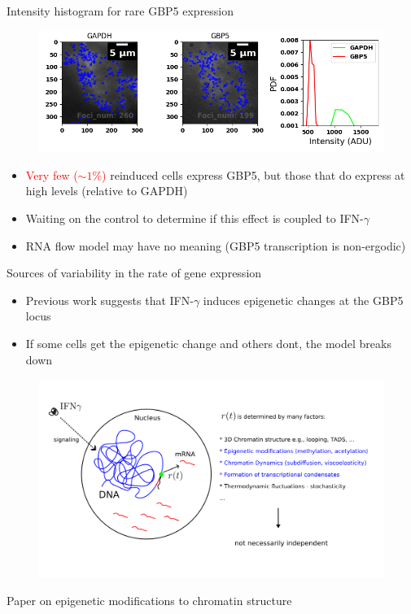 \documentclass[aspectratio=1610]{beamer}					%
\begin{document}
\begin{frame}{Intensity histogram for rare GBP5 expression}
\begin{figure}
\includegraphics[width=14cm]{Detection.png}
\end{figure}
\begin{itemize}
\item \textcolor{red}{Very few ($\sim 1\%$)} reinduced cells express GBP5, but those that do express at high levels (relative to GAPDH)
\item Waiting on the control to determine if this effect is coupled to IFN-$\gamma$ 
\item RNA flow model may have no meaning (GBP5 transcription is non-ergodic)
\end{itemize}
\end{frame}

\begin{frame}{Sources of variability in the rate of gene expression}
\vspace{0.1in}
\begin{itemize}
\item Previous work suggests that IFN-$\gamma$ induces epigenetic changes at the GBP5 locus
\item If some cells get the epigenetic change and others dont, the model breaks down
\end{itemize}

\begin{figure}
\includegraphics[width=13cm]{Sources.png}
\end{figure}
\end{frame}

\begin{frame}{}
Paper on epigenetic modifications to chromatin structure
\end{frame}
\end{document}
